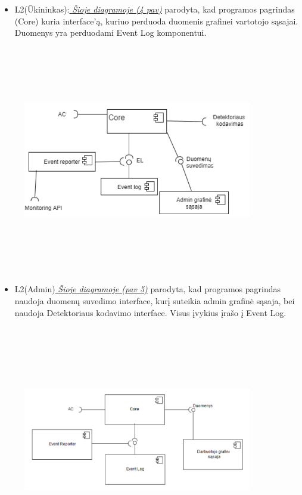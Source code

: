 \documentclass[oneside]{VUMIFPSkursinis}
\begin{document}
	\begin{itemize}
		\item L2(Ūkininkas):\hyperref[fig:l2uki]{\textit{  Šioje diagramoje (4 pav)}} parodyta, kad programos pagrindas (Core) kuria interface'ą, kuriuo perduoda duomenis grafinei vartotojo sąsajai. Duomenys yra perduodami Event Log komponentui. 

	\end{itemize}
	\begin{figure}[H]
	\centering	
\includegraphics[width=10cm,height=10cm,keepaspectratio]{l2admin.png}
\caption{}
\label{fig:l2admin}
\end{figure}
	
	
	\begin{itemize}
		\item L2(Admin)\hyperref[fig:l2admin]{\textit{  Šioje diagramoje (pav 5)}}  parodyta, kad programos pagrindas naudoja duomenų suvedimo interface, kurį suteikia admin grafinė sąsaja, bei naudoja Detektoriaus kodavimo interface. Visus įvykius įrašo į Event Log.

	\end{itemize}
	\begin{figure}[H]
	\centering	
\includegraphics[width=10cm,height=10cm,keepaspectratio]{l2darb.png}
\caption{}
\label{fig:l2darb}
\end{figure}
		
\end{document}
